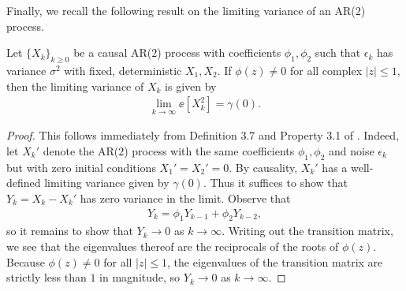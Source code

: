 Finally, we recall the following result on the limiting variance of an AR($2$) process.
\begin{lemma}\label{lem:ar2-limiting-variance}
    Let $\{X_k\}_{k \geq 0}$ be a causal AR($2$) process with coefficients $\phi_1, \phi_2$ such that $\epsilon_k$ has variance $\sigma^2$ with fixed, deterministic $X_1, X_2$.  If $\phi(z) \neq 0$ for all complex $|z| \leq 1$, then the limiting variance of $X_k$ is given by
    \begin{align}
        \lim_{k \to \infty} \ee[X_k^2] = \gamma(0).
    \end{align}
\end{lemma}
\begin{proof}
    This follows immediately from Definition 3.7 and Property 3.1 of \citet{shumway2006time}. Indeed, let $X_k'$ denote the AR($2$) process with the same coefficients $\phi_1, \phi_2$ and noise $\epsilon_k$ but with zero initial conditions $X_1' = X_2' = 0$.  By causality, $X_k'$ has a well-defined limiting variance given by $\gamma(0)$.  Thus it suffices to show that $Y_k = X_k - X_k'$ has zero variance in the limit.  Observe that
    \begin{align}
        Y_k = \phi_1 Y_{k-1} + \phi_2 Y_{k-2},
    \end{align}
    so it remains to show that $Y_k \to 0$ as $k \to \infty$.  Writing out the transition matrix, we see that the eigenvalues thereof are the reciprocals of the roots of $\phi(z)$.  Because $\phi(z) \neq 0$ for all $|z| \leq 1$, the eigenvalues of the transition matrix are strictly less than $1$ in magnitude, so $Y_k \to 0$ as $k \to \infty$.
\end{proof}
